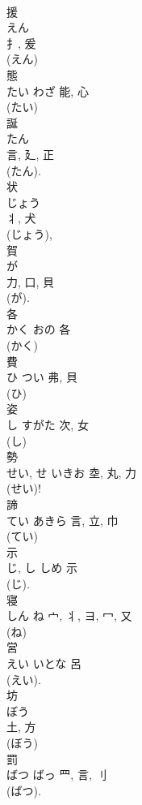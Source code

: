 \documentclass[8pt]{extreport}
\begin{document}
\begin{CJK}{UTF8}{min}
\\	援	
\\	えん	
\\	扌, 爰	
\\	(えん) 
\\	態	
\\	たい	わざ	能, 心	
\\	(たい) 
\\	誕	
\\	たん	
\\	言, 廴, 正	
\\	(たん).	
\\	状	
\\	じょう	
\\	丬, 犬	
\\	(じょう), 
\\	賀	
\\	が	
\\	力, 口, 貝	
\\	(が). 
\\	各	
\\	かく	おの	各	
\\	(かく) 
\\	費	
\\	ひ	つい	弗, 貝	
\\	(ひ) 
\\	姿	
\\	し	すがた	次, 女	
\\	(し) 
\\	勢	
\\	せい, せ	いきお	坴, 丸, 力	
\\	(せい)! 
\\	諦	
\\	てい	あきら	言, 立, 巾	
\\	(てい) 
\\	示	
\\	じ, し	しめ	示	
\\	(じ). 
\\	寝	
\\	しん	ね	宀, 丬, ヨ, 冖, 又	
\\	(ね) 
\\	営	
\\	えい	いとな	呂		
\\	(えい). 
\\	坊	
\\	ぼう	
\\	土, 方	
\\	(ぼう) 
\\	罰	
\\	ばつ	ばっ	罒, 言, 刂	
\\	(ばつ).	

\end{CJK}
\end{document}
